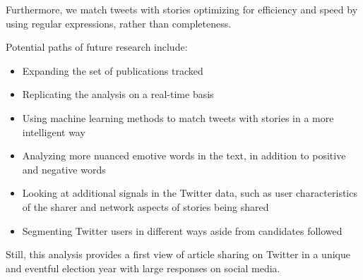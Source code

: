 \documentclass[letterpaper]{article}
\begin{document}
Furthermore, we match tweets with stories optimizing for efficiency and speed by using regular expressions, rather than completeness.

Potential paths of future research include:
\begin{itemize}
\item Expanding the set of publications tracked  
\item Replicating the analysis on a real-time basis
\item Using machine learning methods to match tweets with stories in a more intelligent way
\item Analyzing more nuanced emotive words in the text, in addition to positive and negative words
\item Looking at additional signals in the Twitter data, such as user characteristics of the sharer and network aspects of stories being shared
\item Segmenting Twitter users in different ways aside from candidates followed
 \end{itemize}

Still, this analysis provides a first view of article sharing on Twitter in a unique and eventful election year with large responses on social media.



 
 
\end{document}
